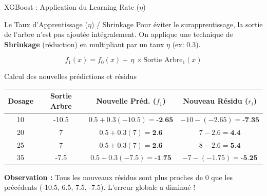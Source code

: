 \begin{frame}{XGBoost : Application du Learning Rate ($\eta$)}
    \begin{block}{Le Taux d'Apprentissage ($\eta$) / Shrinkage}
        Pour éviter le surapprentissage, la sortie de l'arbre n'est pas ajoutée intégralement. On applique une technique de \textbf{Shrinkage} (réduction) en multipliant par un taux $\eta$ (ex: $0.3$).
        
        \vspace{0.1cm}
        $$ f_1(x) = f_0(x) + \, \eta \, \times \text{Sortie Arbre}_1(x) $$
    \end{block}

    \begin{block}{Calcul des nouvelles prédictions et résidus}
        \centering
        \small
        \begin{tabular}{|c|c|c|c|}
            \hline
            \textbf{Dosage} & \textbf{Sortie Arbre} & \textbf{Nouvelle Préd. ($f_1$)} & \textbf{Nouveau Résidu ($r_i$)} \\
            \hline
            10 & -10.5 & $0.5 + 0.3(-10.5) = \textbf{-2.65}$ & $-10 - (-2.65) = \textbf{-7.35}$ \\
            \hline
            20 & 7 & $0.5 + 0.3(7) = \textbf{2.6}$ & $7 - 2.6 = \textbf{4.4}$ \\
            \hline
            25 & 7 & $0.5 + 0.3(7) = \textbf{2.6}$ & $8 - 2.6 = \textbf{5.4}$ \\
            \hline
            35 & -7.5 & $0.5 + 0.3(-7.5) = \textbf{-1.75}$ & $-7 - (-1.75) = \textbf{-5.25}$ \\
            \hline
        \end{tabular}
    \end{block}
    
    \vspace{0.2cm}
    \textbf{Observation :} Tous les nouveaux résidus sont plus proches de 0 que les précédents (-10.5, 6.5, 7.5, -7.5). L'erreur globale a diminué !
\end{frame}

